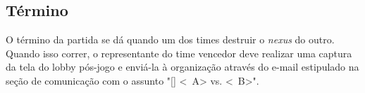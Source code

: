 \subsection{Término}

O término da partida se dá quando um dos times destruir o \textit{nexus} do outro. Quando isso correr, o representante do time vencedor deve realizar uma captura da tela do lobby pós-jogo e enviá-la à organização através do e-mail estipulado na seção de comunicação com o assunto "[\Modality] <\BasicUnit\ A> vs. <\BasicUnit\ B>".